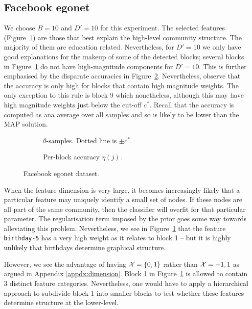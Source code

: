 \subsection{Facebook egonet}

We choose $B=10$ and $D'=10$ for this experiment. The selected features 
(Figure~\ref{fig:fb-null}) are those that best explain the high-level 
community structure. The majority of them are education related. 
Nevertheless, for $D'=10$ we only have good explanations for the makeup 
of some of the detected blocks; several blocks in 
Figure~\ref{fig:fb-null} do not have high-magnitude components for $D'=10$. This is further emphasised by the disparate accuracies in Figure~\ref{fig:fb-accuracy}. Nevertheless, observe that the accuracy is only high for blocks that contain high magnitude weights. The only exception to this rule is block 9 which nonetheless, although this may have high magnitude weights just below the cut-off $c^*$. Recall that the accuracy is computed as ana average over all samples and so is likely to be lower than the MAP solution.
%
\begin{figure}[!h]
	\centering
	\begin{subfigure}[t]{0.45\linewidth}
		\centering
		\caption{$\theta$-samples. Dotted line is $\pm c^*$.}
		\label{fig:fb-null}
	\end{subfigure}
	\begin{subfigure}[t]{0.45\linewidth}
		\centering
		\caption{Per-block accuracy $\eta(j)$.}
		\label{fig:fb-accuracy}
	\end{subfigure}
	\caption{Facebook egonet dataset.}
	\label{fig:fb}
\end{figure}

When the feature dimension is very large, it becomes increasingly likely that 
a particular feature may uniquely identify a small set of nodes. If these nodes 
are all part of the same community, then the classifier will overfit for that 
particular parameter. The regularisation term imposed by the prior goes some 
way towards alleviating this problem. Nevertheless, we see in 
Figure~\ref{fig:fb-null} that the feature \verb*|birthday-5| has a very 
high weight as it relates to block 1 -- but it is highly unlikely
that birthdays determine graphical structure. 

However, we see the advantage of having $\mathcal{X}=\{0,1\}$ rather than $\mathcal{X}={-1, 1}$ as argued in Appendix \ref{appdx:dimension}. Block 1 in Figure~\ref{fig:fb-null} is allowed to contain 3 distinct feature categories. Nevertheless, one would have to apply a hierarchical approach to subdivide block 1 into smaller blocks to test whether these features determine structure at the lower-level.

